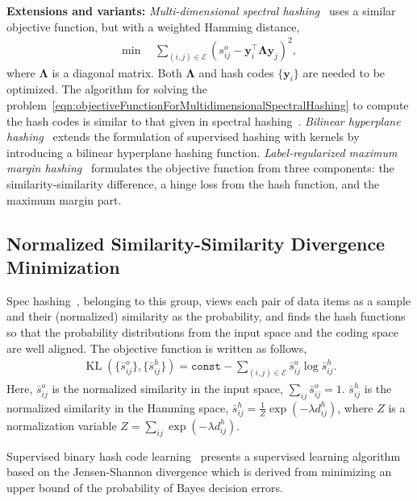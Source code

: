 \documentclass[10pt,journal,compsoc]{IEEEtran}
\begin{document}
\textbf{Extensions and variants:}
\emph{Multi-dimensional spectral hashing}~\cite{WeissFT12}
uses a similar objective function,
but with a weighted Hamming distance,
\begin{align}
\min ~&~ \sum\nolimits_{(i,j) \in \mathcal{E}} (s^o_{ij} - \mathbf{y}_i^\top\boldsymbol{\Lambda}\mathbf{y}_j)^2,
\label{eqn:objectiveFunctionForMultidimensionalSpectralHashing}
\end{align}
where $\boldsymbol{\Lambda}$ is a diagonal matrix.
Both $\boldsymbol{\Lambda}$ and hash codes $\{\mathbf{y}_i\}$ are needed to be optimized.
The algorithm for solving the problem~\ref{eqn:objectiveFunctionForMultidimensionalSpectralHashing}
to compute the hash codes
is similar to that given in spectral hashing~\cite{WeissTF08}.
\emph{Bilinear hyperplane hashing}~\cite{LiuWMKC12} extends
the formulation of supervised hashing with kernels
by introducing a bilinear hyperplane hashing function.
\emph{Label-regularized maximum margin hashing}~\cite{MuSY10}
formulates the objective function
from three components:
the similarity-similarity difference,
a hinge loss from the hash function,
and the maximum margin part.





\subsection{Normalized Similarity-Similarity Divergence Minimization}

Spec hashing~\cite{LinRY10}, belonging to this group,
views each pair of data items as a sample
and their (normalized) similarity
as the probability,
and finds the hash functions
so that
the probability distributions
from the input space and the coding space
are well aligned.
The objective function is written as follows,
\begin{align}
\operatorname{KL}(\{\bar{s}_{ij}^o\}, \{\bar{s}_{ij}^h\}) = \texttt{const} -\sum\nolimits_{(i,j)\in\mathcal{E}}\bar{s}_{ij}^o \operatorname{log} \bar{s}_{ij}^h.
\end{align}
Here,
$\bar{s}_{ij}^o$ is the normalized similarity in the input space,
$\sum_{ij}\bar{s}_{ij}^o = 1$.
$\bar{s}^h_{ij}$
is the normalized similarity
in the Hamming space,
$\bar{s}^h_{ij} = \frac{1}{Z} \exp{(-\lambda d^h_{ij})}$,
where $Z$ is a normalization variable
$Z = \sum_{ij} \exp{(-\lambda d^h_{ij})}$.



Supervised binary hash code learning~\cite{Fan13}
presents a supervised learning algorithm
based on the Jensen-Shannon divergence
which is derived from
minimizing an upper bound
of the probability of Bayes decision errors.
\end{document}
